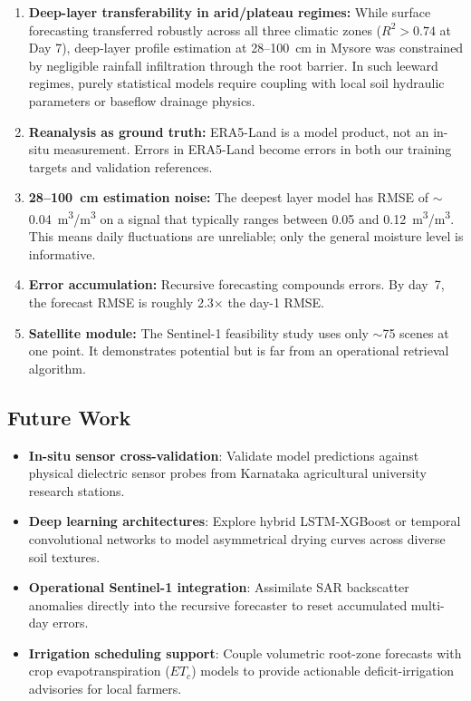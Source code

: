 \documentclass[12pt, a4paper]{article}
\begin{document}
\begin{enumerate}
    \item \textbf{Deep-layer transferability in arid/plateau regimes:} While surface forecasting transferred robustly across all three climatic zones ($R^2 > 0.74$ at Day 7), deep-layer profile estimation at 28--100~cm in Mysore was constrained by negligible rainfall infiltration through the root barrier. In such leeward regimes, purely statistical models require coupling with local soil hydraulic parameters or baseflow drainage physics.
    
    \item \textbf{Reanalysis as ground truth:} ERA5-Land is a model product, not an in-situ measurement. Errors in ERA5-Land become errors in both our training targets and validation references.
    
    \item \textbf{28--100~cm estimation noise:} The deepest layer model has RMSE of $\sim$0.04~m\textsuperscript{3}/m\textsuperscript{3} on a signal that typically ranges between 0.05 and 0.12~m\textsuperscript{3}/m\textsuperscript{3}. This means daily fluctuations are unreliable; only the general moisture level is informative.
    
    \item \textbf{Error accumulation:} Recursive forecasting compounds errors. By day~7, the forecast RMSE is roughly 2.3$\times$ the day-1 RMSE.
    
    \item \textbf{Satellite module:} The Sentinel-1 feasibility study uses only $\sim$75 scenes at one point. It demonstrates potential but is far from an operational retrieval algorithm.
\end{enumerate}

\subsection{Future Work}

\begin{itemize}
    \item \textbf{In-situ sensor cross-validation}: Validate model predictions against physical dielectric sensor probes from Karnataka agricultural university research stations.
    \item \textbf{Deep learning architectures}: Explore hybrid LSTM-XGBoost or temporal convolutional networks to model asymmetrical drying curves across diverse soil textures.
    \item \textbf{Operational Sentinel-1 integration}: Assimilate SAR backscatter anomalies directly into the recursive forecaster to reset accumulated multi-day errors.
    \item \textbf{Irrigation scheduling support}: Couple volumetric root-zone forecasts with crop evapotranspiration ($ET_c$) models to provide actionable deficit-irrigation advisories for local farmers.
\end{itemize}
\end{document}
